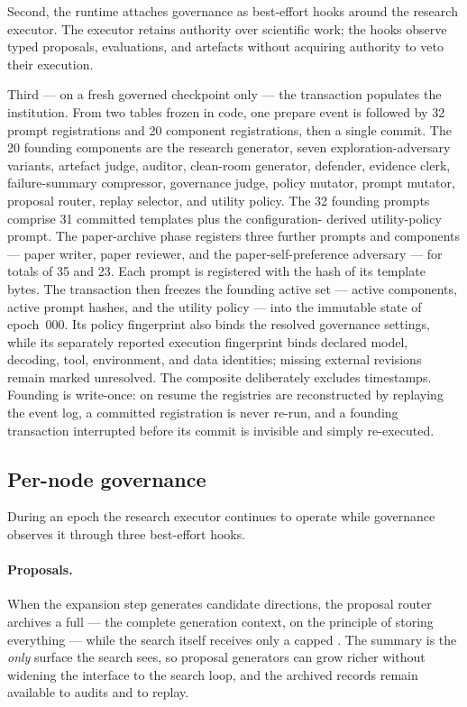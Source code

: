 Second, the runtime attaches governance as best-effort hooks around the
research executor. The executor retains authority over scientific work;
the hooks observe typed proposals, evaluations, and artefacts without
acquiring authority to veto their execution.

Third --- on a fresh governed checkpoint only --- the  transaction populates the institution. From two tables
frozen in code, one prepare event is followed by 32 prompt
registrations and 20 component registrations, then a single commit.
The 20 founding components are the research generator, seven exploration-adversary variants,
artefact judge, auditor, clean-room generator, defender, evidence clerk,
failure-summary compressor, governance judge, policy mutator, prompt
mutator, proposal router, replay selector, and utility policy. The 32
founding prompts comprise 31 committed templates plus the configuration-
derived utility-policy prompt. The paper-archive phase registers three
further prompts and components --- paper writer, paper reviewer, and the
paper-self-preference adversary --- for totals of 35 and 23. Each prompt
is registered with the hash of its template bytes. The transaction then
freezes the founding active
set --- active components, active prompt hashes, and the utility
policy --- into the immutable state of epoch~000. Its policy fingerprint
also binds the resolved governance settings, while its separately reported
execution fingerprint binds declared model, decoding, tool, environment, and
data identities; missing external revisions remain marked unresolved. The
composite deliberately excludes timestamps. Founding is write-once: on resume the
registries are reconstructed by replaying the event log, a committed
registration is never re-run, and a founding transaction interrupted
before its commit is invisible and simply re-executed.

\subsection{Per-node governance}\label{sec:rqgm:node}

During an epoch the research executor continues to operate while
governance observes it through three best-effort hooks.

\paragraph{Proposals.}
When the expansion step generates candidate directions, the proposal
router archives a full  --- the complete
generation context, on the principle of storing everything --- while
the search itself receives only a capped . The summary is the \emph{only} surface the search sees, so
proposal generators can grow richer without widening the interface to
the search loop, and the archived records remain available to audits
and to replay.

